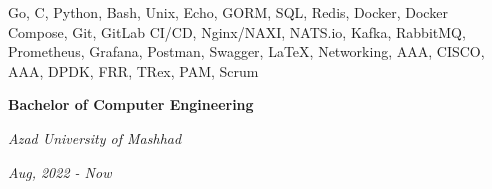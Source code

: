 \documentclass{engineercv}
\begin{document}
\begin{multicols}{2}
  \begin{minipage}{0.45\textwidth}
    Go, C, Python, Bash, Unix, Echo, GORM, SQL, Redis, Docker, Docker Compose, Git, GitLab CI/CD,
    Nginx/NAXI, NATS.io, Kafka, RabbitMQ, Prometheus, Grafana, Postman, Swagger, \LaTeX, Networking,
    AAA, CISCO, AAA, DPDK, FRR, TRex, PAM, Scrum
  \end{minipage}
  \columnbreak
  \begin{minipage}{0.45\textwidth}
    \textbf{Bachelor of Computer Engineering}

    \textit{Azad University of Mashhad}

    \textit{Aug, 2022 - Now}
  \end{minipage}
\end{multicols}
\end{document}
